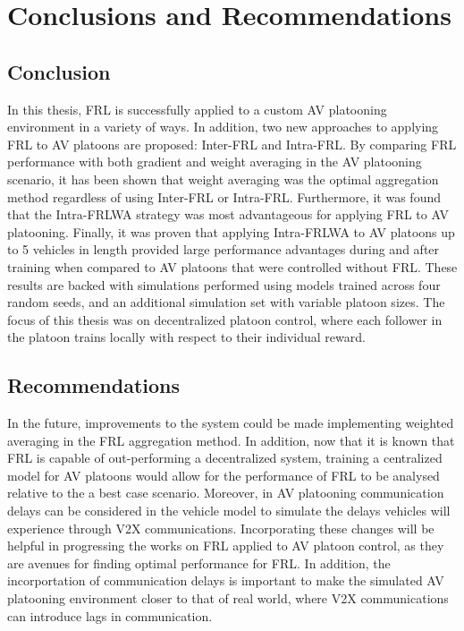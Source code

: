 \chapter{Conclusions and Recommendations} \label{chap:conclusion}
\section{Conclusion}
In this thesis, FRL is successfully applied to a custom AV platooning environment in a variety of ways.
In addition, two new approaches to applying
FRL to AV platoons are proposed: Inter-FRL and Intra-FRL.  By comparing FRL performance with both
gradient and weight averaging in the AV platooning scenario, it has been shown that
weight averaging was the optimal aggregation method regardless of using Inter-FRL or
Intra-FRL.  Furthermore, it was found that the Intra-FRLWA strategy was most advantageous
for applying FRL to AV platooning.  Finally, it was proven that applying Intra-FRLWA to
AV platoons up to 5 vehicles in length provided large performance advantages during and
after training when compared to AV platoons that were controlled without FRL. These
results are backed with simulations performed using models trained across four random
seeds, and an additional simulation set with variable platoon sizes.  The focus of this
thesis was on decentralized platoon control, where each follower in the platoon trains
locally with respect to their individual reward.

\section{Recommendations}
In the future, improvements to the system could be made implementing weighted averaging in
the FRL aggregation method. In addition, now that it is known that FRL is capable of out-performing
a decentralized system, training a centralized model for AV platoons
would allow for the performance of FRL to be analysed relative to the a best case scenario.
Moreover, in AV platooning communication delays can be
considered in the vehicle model to simulate the delays vehicles will experience through V2X
communications. Incorporating these changes will be helpful in progressing the works on FRL applied to AV
platoon control, as they are avenues for finding optimal performance for FRL. In addition,
the incorportation of communication delays is important to make the simulated AV platooning
environment closer to that of real world, where V2X communications can introduce lags in communication.
